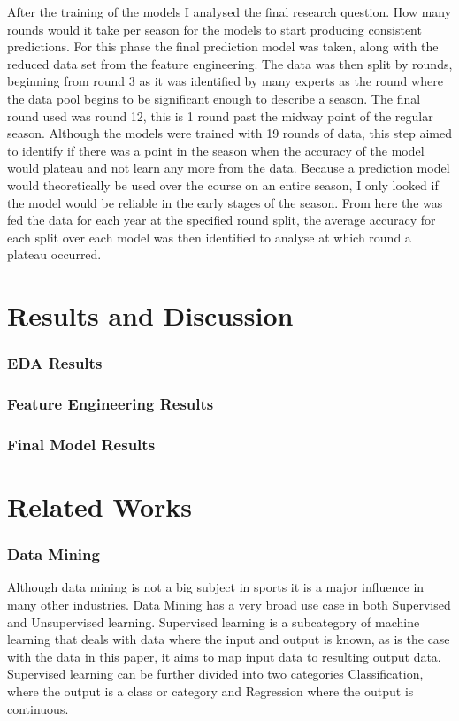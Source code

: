 \documentclass{imc-inf}
\begin{document}
	After the training of the models I analysed the final research question. How many rounds would it take per season for the models to start producing consistent predictions. For this phase the final prediction model was taken, along with the reduced data set from the feature engineering. The data was then split by rounds, beginning from round 3 as it was identified by many experts as the round where the data pool begins to be significant enough to describe a season. The final round used was round 12, this is 1 round past the midway point of the regular season. Although the models were trained with 19 rounds of data, this step aimed to identify if there was a point in the season when the accuracy of the model would plateau and not learn any more from the data. Because a prediction model would theoretically be used over the course on an entire season, I only looked if the model would be reliable in the early stages of the season. From here the was fed the data for each year at the specified round split, the average accuracy for each split over each model was then identified to analyse at which round a plateau occurred.
	
	\chapter{Results and Discussion}\label{chap:Results}
	
	\subsection{EDA Results}
	
	\subsection{Feature Engineering Results}
	
	\subsection{Final Model Results}
	
	\chapter{Related Works}\label{chap:related_works}
	\subsection{Data Mining}
	Although data mining is not a big subject in sports it is a major influence in many other industries. Data Mining has a very broad use case in both Supervised and Unsupervised learning. Supervised learning is a subcategory of machine learning that deals with data where the input and output is known, as is the case with the data in this paper, it aims to map input data to resulting output data. Supervised learning can be further divided into two categories Classification, where the output is a class or category and Regression where the output is continuous. 
	
\end{document}

